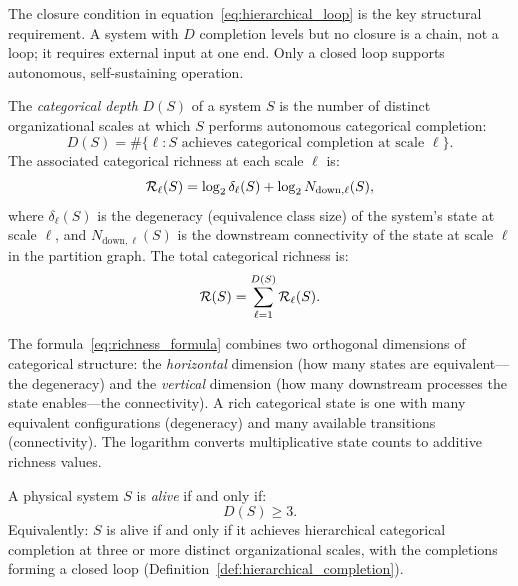 The closure condition in equation~\eqref{eq:hierarchical_loop} is the key
structural requirement. A system with $D$ completion levels but no closure is
a chain, not a loop; it requires external input at one end. Only a closed loop
supports autonomous, self-sustaining operation.

\begin{definition}
\label{def:categorical_depth}
The \emph{categorical depth} $D(S)$ of a system $S$ is the number of distinct
organizational scales at which $S$ performs autonomous categorical completion:
\begin{equation}
  D(S) = \#\bigl\{\ell : S \text{ achieves categorical completion at scale } \ell\bigr\}.
  \label{eq:categorical_depth}
\end{equation}
The associated categorical richness at each scale $\ell$ is:
\begin{equation}
  \mathcal{R}_\ell(S) = \log_2 \delta_\ell(S) + \log_2 N_{\mathrm{down},\ell}(S),
  \label{eq:richness_formula}
\end{equation}
where $\delta_\ell(S)$ is the degeneracy (equivalence class size) of the
system's state at scale $\ell$, and $N_{\mathrm{down},\ell}(S)$ is the
downstream connectivity of the state at scale $\ell$ in the partition graph.
The total categorical richness is:
\begin{equation}
  \mathcal{R}(S) = \sum_{\ell=1}^{D(S)} \mathcal{R}_\ell(S).
  \label{eq:total_richness}
\end{equation}
\end{definition}

The formula~\eqref{eq:richness_formula} combines two orthogonal dimensions of
categorical structure: the \emph{horizontal} dimension (how many states are
equivalent---the degeneracy) and the \emph{vertical} dimension (how many
downstream processes the state enables---the connectivity). A rich categorical
state is one with many equivalent configurations (degeneracy) and many available
transitions (connectivity). The logarithm converts multiplicative state counts
to additive richness values.

\begin{definition}
\label{def:life}
A physical system $S$ is \emph{alive} if and only if:
\begin{equation}
  D(S) \geq 3.
  \label{eq:life_criterion}
\end{equation}
Equivalently: $S$ is alive if and only if it achieves hierarchical categorical
completion at three or more distinct organizational scales, with the completions
forming a closed loop (Definition~\ref{def:hierarchical_completion}).
\end{definition}

